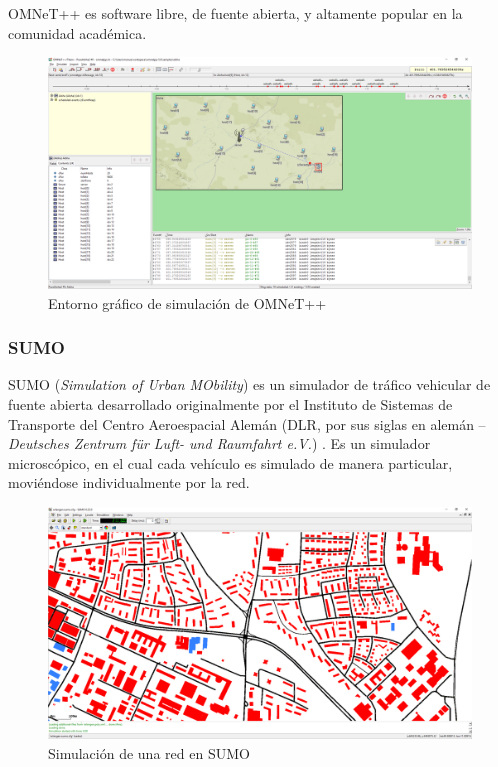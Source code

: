 \documentclass[11pt,letterpaper]{article}
\begin{document}
OMNeT++ es software libre, de fuente abierta, y altamente popular en la comunidad académica.


\begin{figure}[ht]
  \centering
  \includegraphics[width=\linewidth]{aloha.png}
  \caption{Entorno gráfico de simulación de OMNeT++}
  \label{fig:omnetgui}
\end{figure}

\subsubsection{SUMO}

SUMO (\emph{Simulation of Urban MObility}) es un simulador de tráfico vehicular de fuente abierta desarrollado originalmente por el Instituto de Sistemas de Transporte del Centro Aeroespacial Alemán (DLR, por sus siglas en alemán -- \emph{Deutsches Zentrum für Luft- und Raumfahrt e.V.}) \cite{sumo}. Es un simulador microscópico, en el cual cada vehículo es simulado de manera particular, moviéndose individualmente por la red.

\begin{figure}[ht]
  \centering
  \includegraphics[width=\linewidth]{sumo_demo.png}
  \caption{Simulación de una red en SUMO}
  \label{fig:sumo_demo}
\end{figure}
\end{document}
